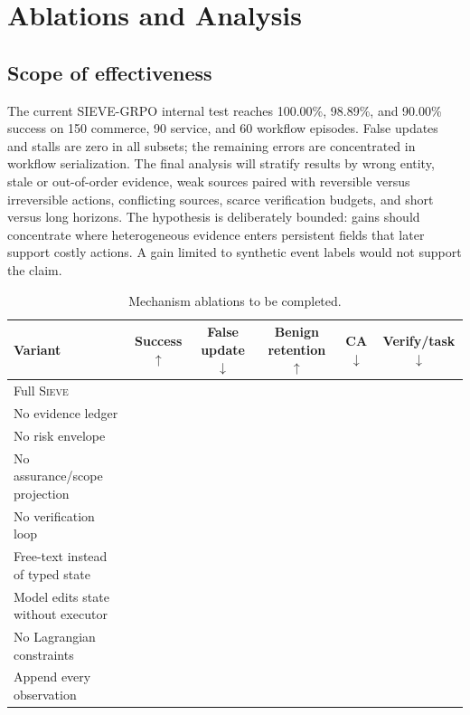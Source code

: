 \documentclass{article}
\newcommand{\method}{\textsc{Sieve}}
\newcommand{\placeholder}{\textemdash}
\begin{document}
\section{Ablations and Analysis}
\label{sec:analysis}

\subsection{Scope of effectiveness}

The current SIEVE-GRPO internal test reaches 100.00\%, 98.89\%, and 90.00\% success on 150 commerce, 90 service, and 60 workflow episodes. False updates and stalls are zero in all subsets; the remaining errors are concentrated in workflow serialization. The final analysis will stratify results by wrong entity, stale or out-of-order evidence, weak sources paired with reversible versus irreversible actions, conflicting sources, scarce verification budgets, and short versus long horizons. The hypothesis is deliberately bounded: gains should concentrate where heterogeneous evidence enters persistent fields that later support costly actions. A gain limited to synthetic event labels would not support the claim.

\begin{table}[t]
\centering
\scriptsize
\caption{Mechanism ablations to be completed.}
\label{tab:mechanism-ablation}
\begin{tabular}{@{}lccccc@{}}
\toprule
Variant & Success $\uparrow$ & False update $\downarrow$ & Benign retention $\uparrow$ & CA $\downarrow$ & Verify/task $\downarrow$ \\
\midrule
Full \method & \placeholder & \placeholder & \placeholder & \placeholder & \placeholder \\
No evidence ledger & \placeholder & \placeholder & \placeholder & \placeholder & \placeholder \\
No risk envelope & \placeholder & \placeholder & \placeholder & \placeholder & \placeholder \\
No assurance/scope projection & \placeholder & \placeholder & \placeholder & \placeholder & \placeholder \\
No verification loop & \placeholder & \placeholder & \placeholder & \placeholder & \placeholder \\
Free-text instead of typed state & \placeholder & \placeholder & \placeholder & \placeholder & \placeholder \\
Model edits state without executor & \placeholder & \placeholder & \placeholder & \placeholder & \placeholder \\
No Lagrangian constraints & \placeholder & \placeholder & \placeholder & \placeholder & \placeholder \\
Append every observation & \placeholder & \placeholder & \placeholder & \placeholder & \placeholder \\
\bottomrule
\end{tabular}
\end{table}
\end{document}
